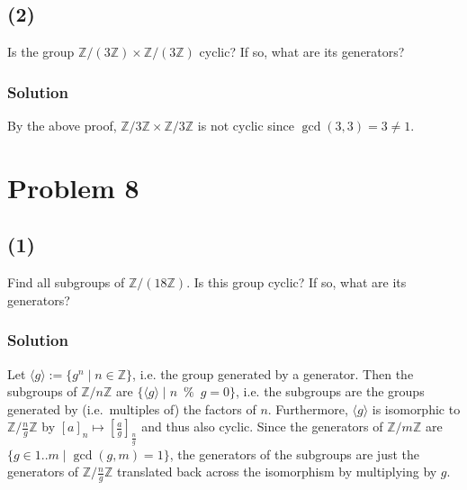 \documentclass[fleqn]{article}
\begin{document}
        \subsection{(2)}
        Is the group $\mathbb{Z}/(3 \mathbb{Z}) \times \mathbb{Z}/(3 \mathbb{Z})$ cyclic?  If so, what are its generators?
            
            \subsubsection{Solution}
            By the above proof, $\mathbb{Z}/3\mathbb{Z} \times \mathbb{Z}/3\mathbb{Z}$ is not cyclic since $\gcd(3, 3) = 3 \neq 1$.
            
    \section{Problem 8}
        
        \subsection{(1)}
        Find all subgroups of $\mathbb{Z}/(18 \mathbb{Z})$.  Is this group cyclic?  If so, what are its generators?
            
            \subsubsection{Solution}
            Let $\langle g \rangle := \{g^n \mid n \in \mathbb{Z}\}$, i.e. the group generated by a generator.  Then the subgroups of $\mathbb{Z}/n\mathbb{Z}$ are $\{\langle g \rangle \mid n \enspace \% \enspace g = 0\}$, i.e. the subgroups are the groups generated by (i.e.\ multiples of) the factors of $n$.  Furthermore, $\langle g \rangle$ is isomorphic to $\mathbb{Z}/\frac{n}{g}\mathbb{Z}$ by $[a]_n \mapsto \left[\frac{a}{g}\right]_{\frac{n}{g}}$ and thus also cyclic.  Since the generators of $\mathbb{Z}/m\mathbb{Z}$ are $\{g \in 1..m \mid \gcd(g, m) = 1\}$, the generators of the subgroups are just the generators of $\mathbb{Z}/\frac{n}{g}\mathbb{Z}$ translated back across the isomorphism by multiplying by $g$.
            
            \pagebreak
            
\end{document}
